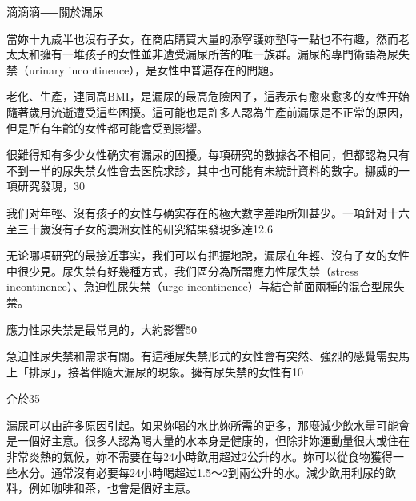 \documentclass[12pt,UTF8]{ctexbook}
\begin{document}
滴滴滴⸺關於漏尿




當妳十九歲半也沒有子女，在商店購買大量的添寧護妳墊時一點也不有趣，然而老太太和擁有一堆孩子的女性並非遭受漏尿所苦的唯一族群。漏尿的專門術語為尿失禁（urinary incontinence），是女性中普遍存在的問題。

老化、生產，連同高BMI，是漏尿的最高危險因子，這表示有愈來愈多的女性开始隨著歲月流逝遭受這些困擾。這可能也是許多人認為生產前漏尿是不正常的原因，但是所有年齡的女性都可能會受到影響。

很難得知有多少女性确实有漏尿的困擾。每項研究的數據各不相同，但都認為只有不到一半的尿失禁女性會去医院求診，其中也可能有未統計資料的數字。挪威的一項研究發現，30%

我们对年輕、沒有孩子的女性与确实存在的極大數字差距所知甚少。一項針对十六至三十歲沒有子女的澳洲女性的研究結果發現多達12.6%

无论哪項研究的最接近事实，我们可以有把握地說，漏尿在年輕、沒有子女的女性中很少見。尿失禁有好幾種方式，我们區分為所謂應力性尿失禁（stress incontinence）、急迫性尿失禁（urge incontinence）与結合前面兩種的混合型尿失禁。

應力性尿失禁是最常見的，大約影響50%

急迫性尿失禁和需求有關。有這種尿失禁形式的女性會有突然、強烈的感覺需要馬上「排尿」，接著伴隨大漏尿的現象。擁有尿失禁的女性有10%

介於35%

漏尿可以由許多原因引起。如果妳喝的水比妳所需的更多，那麼減少飲水量可能會是一個好主意。很多人認為喝大量的水本身是健康的，但除非妳運動量很大或住在非常炎熱的氣候，妳不需要在每24小時飲用超过2公升的水。妳可以從食物獲得一些水分。通常沒有必要每24小時喝超过1.5〜2到兩公升的水。減少飲用利尿的飲料，例如咖啡和茶，也會是個好主意。
\end{document}
